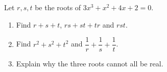 Let $r,s,t$ be the roots of $3x^3+x^2+4x+2=0$.
\begin{enumerate}
\item[(a)] Find $r+s+t$, $rs+st+tr$ and $rst$.
\item[(b)] Find $r^2+s^2+t^2$ and $\dfrac{1}{r}+\dfrac{1}{s}+\dfrac{1}{t}$.
\item[(c)] Explain why the three roots cannot all be real.
\end{enumerate}
